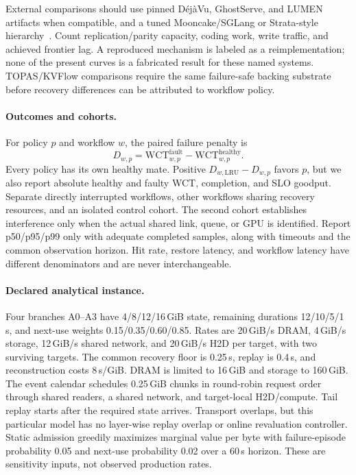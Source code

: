 \documentclass[sigplan,10pt,anonymous,nonacm]{acmart}
\begin{document}
External comparisons should use pinned D\'ej\`aVu, GhostServe, and LUMEN
artifacts when compatible, and a tuned Mooncake/SGLang or Strata-style
hierarchy~\cite{strati2024dejavu,jayakody2026ghostserve,cao2026lumen,qin2025mooncake,xie2026strata}.
Count replication/parity capacity, coding work, write traffic, and achieved
frontier lag. A reproduced mechanism is labeled as a reimplementation;
none of the present curves is a fabricated result for these named systems.
TOPAS/KVFlow comparisons require the same failure-safe backing substrate
before recovery differences can be attributed to workflow policy.

\paragraph{Outcomes and cohorts.}
For policy $p$ and workflow $w$, the paired failure penalty is
\begin{equation}
 D_{w,p}=\mathrm{WCT}^{\mathrm{fault}}_{w,p}
          -\mathrm{WCT}^{\mathrm{healthy}}_{w,p}.
 \label{eq:eval-penalty}
\end{equation}
Every policy has its own healthy mate. Positive
$D_{w,\mathrm{LRU}}-D_{w,p}$ favors $p$, but we also report absolute healthy
and faulty WCT, completion, and SLO goodput. Separate directly interrupted
workflows, other workflows sharing recovery resources, and an isolated
control cohort. The second cohort establishes interference only when
the actual shared link, queue, or GPU is identified. Report p50/p95/p99
only with adequate completed samples, along with timeouts and the common
observation horizon. Hit rate, restore latency, and workflow latency have
different denominators and are never interchangeable.

\paragraph{Declared analytical instance.}
Four branches A0--A3 have 4/8/12/16\,GiB state, remaining durations
12/10/5/1\,s, and next-use weights 0.15/0.35/0.60/0.85. Rates are
20\,GiB/s DRAM, 4\,GiB/s storage, 12\,GiB/s shared network, and
20\,GiB/s H2D per target, with two surviving targets. The common recovery
floor is 0.25\,s, replay is 0.4\,s, and reconstruction costs 8\,s/GiB.
DRAM is limited to 16\,GiB and storage to 160\,GiB. The event calendar
schedules 0.25\,GiB chunks in round-robin request order through shared
readers, a shared network, and target-local H2D/compute. Tail replay starts
after the required state arrives. Transport overlaps, but this particular
model has no layer-wise replay overlap or online revaluation controller.
Static admission greedily maximizes marginal value per byte with
failure-episode probability 0.05 and next-use probability 0.02 over a
60\,s horizon. These are sensitivity inputs, not observed production rates.
\end{document}
